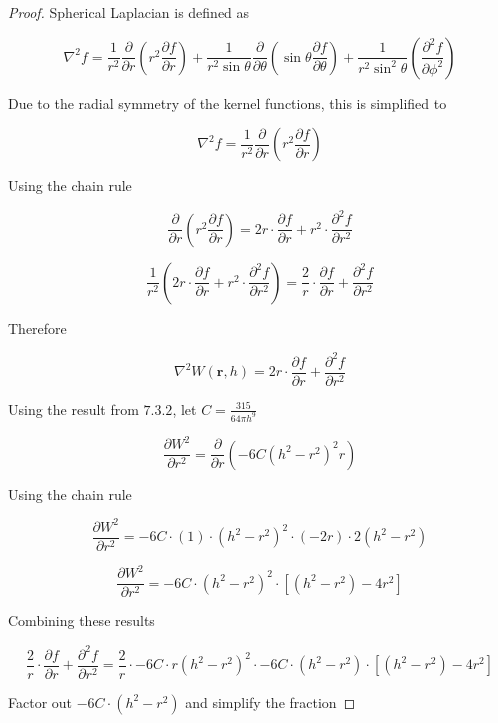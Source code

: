 \documentclass[12pt]{article}
\begin{document}
    \begin{proof}
        Spherical Laplacian is defined as

        $$\nabla^2 f = \frac{1}{r^2}\frac{\partial}{\partial{r}}\left(r^2\frac{\partial{f}}{\partial{r}}\right) + \frac{1}{r^2\sin\theta}\frac{\partial}{\partial{\theta}}\left(\sin\theta\frac{\partial{f}}{\partial{\theta}}\right) + \frac{1}{r^2\sin^2\theta}\left(\frac{\partial^2{f}}{\partial{\phi^2}}\right)$$

        Due to the radial symmetry of the kernel functions, this is simplified to

        $$\nabla^2 f = \frac{1}{r^2}\frac{\partial}{\partial{r}}\left(r^2\frac{\partial{f}}{\partial{r}}\right)$$
        
        Using the chain rule

        $$\frac{\partial}{\partial{r}}\left(r^2\frac{\partial{f}}{\partial{r}}\right) = 2r \cdot \frac{\partial{f}}{\partial{r}} + r^2 \cdot \frac{\partial^2{f}}{\partial{r^2}}$$

        $$\frac{1}{r^2} \left(2r \cdot \frac{\partial{f}}{\partial{r}} + r^2 \cdot \frac{\partial^2{f}}{\partial{r^2}}\right) = \frac{2}{r} \cdot \frac{\partial{f}}{\partial{r}} + \frac{\partial^2{f}}{\partial{r^2}}$$

        Therefore

        $$\nabla^2 W(\textbf{r}, h) = {2}{r} \cdot \frac{\partial{f}}{\partial{r}} + \frac{\partial^2{f}}{\partial{r^2}}$$

        Using the result from $7.3.2$, let $C = \frac{315}{64\pi{h}^9}$

        $$\frac{\partial{W}^2}{\partial{r^2}} = \frac{\partial}{\partial{r}} \left(-6C(h^2 - r^2)^2r\right)$$

        Using the chain rule

        $$\frac{\partial{W}^2}{\partial{r^2}} = -6C \cdot (1) \cdot (h^2 - r^2)^2 \cdot (-2r) \cdot 2(h^2-r^2)$$

        $$\frac{\partial{W}^2}{\partial{r^2}} = -6C \cdot (h^2 - r^2)^2 \cdot \left[\left(h^2 - r^2\right) - 4r^2\right]$$

        Combining these results

        $$\frac{2}{r} \cdot \frac{\partial{f}}{\partial{r}} + \frac{\partial^2{f}}{\partial{r^2}} = \frac{2}{r} \cdot -6C \cdot r(h^2 - r^2)^2 \cdot -6C \cdot (h^2 - r^2) \cdot \left[\left(h^2 - r^2\right) - 4r^2\right]$$

        Factor out $-6C \cdot (h^2 - r^2)$ and simplify the fraction


\end{proof}
\end{document}
